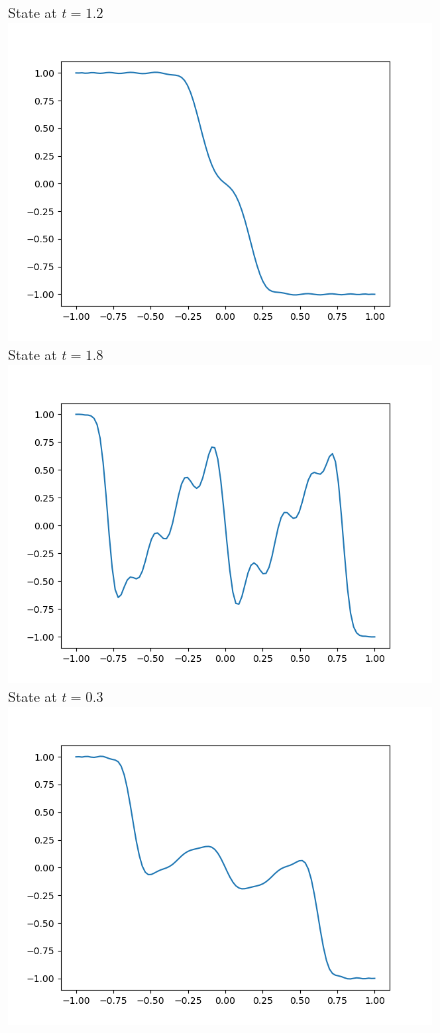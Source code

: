 \documentclass[a4paper,8pt]{article}
\begin{document}
\begin{figure}[h!]
\begin{multicols}{2}
State at $t=1.2$
\includegraphics[width=1\linewidth]{t1.8_plot.png}\\
State at $t=1.8$
\includegraphics[width=1\linewidth]{t0.3_plot.png}\\
State at $t=0.3$
\includegraphics[width=1\linewidth]{t0.9_plot.png}\\

\end{multicols}
\end{figure}
\end{document}
